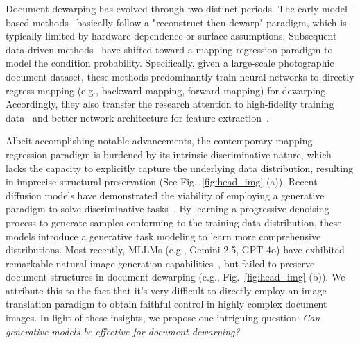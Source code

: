 Document dewarping has evolved through two distinct periods. The early model-based methods~\cite{Kanungo_1993, cao2003cylindrical, RN19} basically follow a "reconstruct-then-dewarp" paradigm, which is typically limited by hardware dependence or surface assumptions.
Subsequent data-driven methods~\cite{ma2018docunet, li2019document, das2019dewarpnet} have shifted toward a mapping regression paradigm to model the condition probability. Specifically, given a large-scale photographic document dataset, these methods predominantly train neural networks to directly regress mapping (e.g., backward mapping, forward mapping) for dewarping. Accordingly, they also transfer the research attention to high-fidelity training data~\cite{zhang_2024_docregistration, verhoeven2023neural, zhang2024reg} and better network architecture for feature extraction~\cite{li2023foreground, Feng2022geodocnet}. 

Albeit accomplishing notable advancements, the contemporary mapping regression paradigm is burdened by its intrinsic discriminative nature, which lacks the capacity to explicitly capture the underlying data distribution, resulting in imprecise structural preservation (See Fig.~\ref{fig:head_img} (a)).
Recent diffusion models have demonstrated the viability of employing a generative paradigm to solve discriminative tasks~\cite{ravishankar_2024_scaling, nam_2024_diffmatch, luo2024flowdiffuser}. By learning a progressive denoising process to generate samples conforming to the training data distribution, these models introduce a generative task modeling to learn more comprehensive distributions.
Most recently, MLLMs (e.g., Gemini 2.5, GPT-4o) have exhibited remarkable natural image generation capabilities~\cite{yan2025gpt-imgeval}, but failed to preserve document structures in document dewarping (e.g., Fig.~\ref{fig:head_img} (b)). We attribute this to the fact that it’s very difficult to directly employ an image translation
paradigm to obtain faithful control in highly complex document images. In light of these insights, we propose one intriguing question: \textit{Can generative models be effective for document dewarping?}



